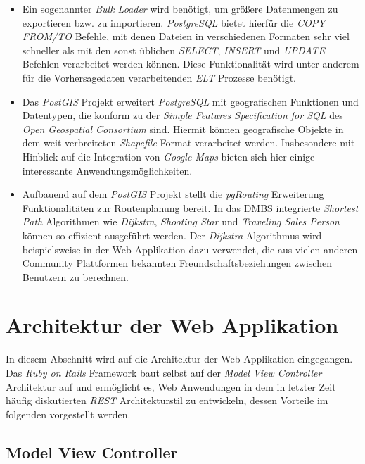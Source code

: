\begin{itemize}
\item Ein sogenannter \textit{Bulk Loader} wird benötigt, um größere
  Datenmengen zu exportieren bzw. zu importieren. \textit{PostgreSQL}
  bietet hierfür die \textit{COPY FROM/TO} Befehle, mit denen Dateien
  in verschiedenen Formaten sehr viel schneller als mit den sonst
  üblichen \textit{SELECT}, \textit{INSERT} und \textit{UPDATE}
  Befehlen verarbeitet werden können. Diese Funktionalität wird unter
  anderem für die Vorhersagedaten verarbeitenden \textit{ELT} Prozesse
  benötigt.

\item Das \textit{PostGIS} Projekt erweitert \textit{PostgreSQL} mit
  geografischen Funktionen und Datentypen, die konform zu der
  \textit{Simple Features Specification for SQL} des \textit{Open
    Geospatial Consortium} sind. Hiermit können geografische Objekte
  in dem weit verbreiteten \textit{Shapefile} Format verarbeitet
  werden. Insbesondere mit Hinblick auf die Integration von
  \textit{Google Maps} bieten sich hier einige interessante
  Anwendungsmöglichkeiten.

\item Aufbauend auf dem \textit{PostGIS} Projekt stellt die
  \textit{pgRouting} Erweiterung Funktionalitäten zur Routenplanung
  bereit. In das DMBS integrierte \textit{Shortest Path} Algorithmen
  wie \textit{Dijkstra}, \textit{Shooting Star} und \textit{Traveling
    Sales Person} können so effizient ausgeführt werden. Der
  \textit{Dijkstra} Algorithmus wird beispielsweise in der Web
  Applikation dazu verwendet, die aus vielen anderen Community
  Plattformen bekannten Freundschaftsbeziehungen zwischen Benutzern zu
  berechnen.

\end{itemize}

\section{Architektur der Web Applikation}
In diesem Abschnitt wird auf die Architektur der Web Applikation
eingegangen. Das \textit{Ruby on Rails} Framework baut selbst auf der
\textit{Model View Controller} Architektur auf und ermöglicht es, Web
Anwendungen in dem in letzter Zeit häufig diskutierten \textit{REST}
Architekturstil zu entwickeln, dessen Vorteile im folgenden
vorgestellt werden.

\subsection{Model View Controller}
\label{Model View Controller}

